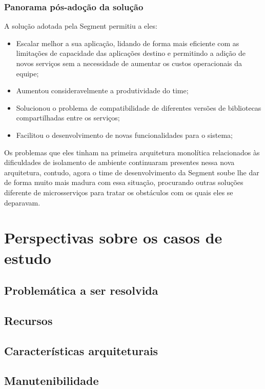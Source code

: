 \subsubsection{Panorama pós-adoção da solução}

A solução adotada pela Segment permitiu a eles:

\begin{itemize}
    \item Escalar melhor a sua aplicação, lidando de forma mais eficiente com as limitações de
        capacidade das aplicações destino e permitindo a adição de novos serviços sem a necessidade
        de aumentar os custos operacionais da equipe;
    \item Aumentou consideravelmente a produtividade do time;
    \item Solucionou o problema de compatibilidade de diferentes versões de bibliotecas
        compartilhadas entre os serviços;
    \item Facilitou o desenvolvimento de novas funcionalidades para o sistema;
\end{itemize}

Os problemas que eles tinham na primeira arquitetura monolítica relacionados às dificuldades de
isolamento de ambiente continuaram presentes nessa nova arquitetura, contudo, agora o time de
desenvolvimento da Segment soube lhe dar de forma muito mais madura com essa situação, procurando
outras soluções diferente de microsserviços para tratar os obstáculos com os quais eles se
deparavam.

\section{Perspectivas sobre os casos de estudo}

\subsection{Problemática a ser resolvida}
\subsection{Recursos}
\subsection{Características arquiteturais}
\subsection{Manutenibilidade}
